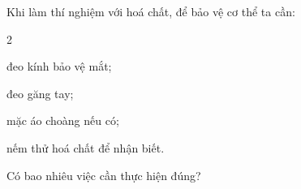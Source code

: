 \documentclass[Main.tex]{subfiles}
\begin{document}
	\begin{ex}
		Khi làm thí nghiệm với hoá chất, để bảo vệ cơ thể ta cần: 
		\begin{enumEX}{2}
			\item[(1)] đeo kính bảo vệ mắt;
			\item[(2)] đeo găng tay;
			\item[(3)] mặc áo choàng nếu có;
			\item[(4)] nếm thử hoá chất để nhận biết.
		\end{enumEX}
		Có bao nhiêu việc cần thực hiện đúng?
	\end{ex}
\end{document}
